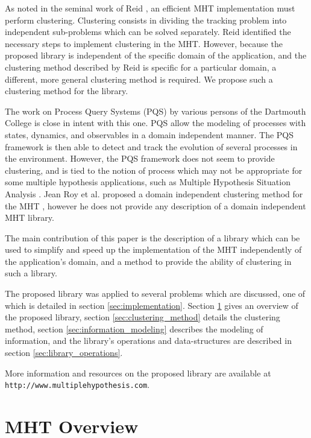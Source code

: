 As noted in the seminal work of Reid \cite{Reid79analgorithm}, an efficient MHT implementation must perform clustering. Clustering consists in dividing the tracking problem into independent sub-problems which can be solved separately. Reid identified the necessary steps to implement clustering in the MHT. However, because the proposed library is independent of the specific domain of the application, and the clustering method described by Reid is specific for a particular domain, a different, more general clustering method is required. We propose such a clustering method for the library.


The work on Process Query Systems (PQS) \cite{ProcessQuerySystemsIntro} by various persons of the Dartmouth College is close in intent with this one. PQS allow the modeling of processes with states, dynamics, and observables in a domain independent manner. The PQS framework is then able to detect and track the evolution of several processes in the environment. However, the PQS framework does not seem to provide clustering, and is tied to the notion of process which may not be appropriate for some multiple hypothesis applications, such as Multiple Hypothesis Situation Analysis \cite{JeanRoyMHSA}.
Jean Roy et al. proposed a domain independent clustering method for the MHT \cite{JeanRoyClusters}, however he does not provide any description of a domain independent MHT library.


The main contribution of this paper is the description of a library which can be used to simplify and speed up the implementation of the MHT independently of the application's domain,  and a method to provide the ability of clustering in such a library.

The proposed library was applied to several problems which are discussed, one of which is detailed in section \ref{sec:implementation}.
Section \ref{sec:overview} gives an overview of the proposed library, section \ref{sec:clustering_method} details the clustering method, section \ref{sec:information_modeling} describes the modeling of information, and the library's operations and data-structures are described in section \ref{sec:library_operations}.

More information and resources on the proposed library are available at \texttt{http://www.multiplehypothesis.com}.


\section{MHT Overview}
\label{sec:overview}

